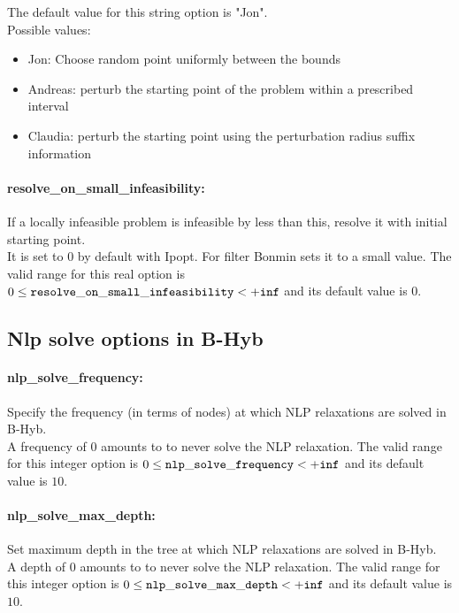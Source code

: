 The default value for this string option is "Jon".
\\ 
Possible values:
\begin{itemize}
   \item Jon: Choose random point uniformly between the bounds
   \item Andreas: perturb the starting point of the problem
within a prescribed interval
   \item Claudia: perturb the starting point using the
perturbation radius suffix information
\end{itemize}

\paragraph{resolve\_on\_small\_infeasibility:}\label{sec:resolve_on_small_infeasibility} If a locally infeasible problem is infeasible by less than this, resolve it with initial starting point. $\;$ \\
 It is set to 0 by default with Ipopt. For filter
Bonmin sets it to a small value. The valid range for this real option is 
$0 \le {\tt resolve\_on\_small\_infeasibility } <  {\tt +inf}$
and its default value is $0$.


\subsection{Nlp solve options in B-Hyb}
\label{sec:Nlp_solve_options_in_B-Hyb}
\paragraph{nlp\_solve\_frequency:}\label{sec:nlp_solve_frequency} Specify the frequency (in terms of nodes) at which NLP relaxations are solved in B-Hyb. $\;$ \\
 A frequency of 0 amounts to to never solve the
NLP relaxation. The valid range for this integer option is
$0 \le {\tt nlp\_solve\_frequency } <  {\tt +inf}$
and its default value is $10$.


\paragraph{nlp\_solve\_max\_depth:}\label{sec:nlp_solve_max_depth} Set maximum depth in the tree at which NLP relaxations are solved in B-Hyb. $\;$ \\
 A depth of 0 amounts to to never solve the NLP
relaxation. The valid range for this integer option is
$0 \le {\tt nlp\_solve\_max\_depth } <  {\tt +inf}$
and its default value is $10$.


